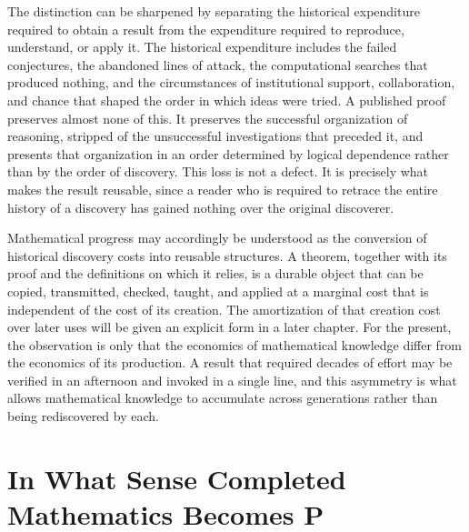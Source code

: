 \documentclass[11pt,letterpaper]{report}
\theoremstyle{plain}
\theoremstyle{definition}
\theoremstyle{remark}
\begin{document}
The distinction can be sharpened by separating the historical expenditure required to obtain a result from the expenditure required to reproduce, understand, or apply it. The historical expenditure includes the failed conjectures, the abandoned lines of attack, the computational searches that produced nothing, and the circumstances of institutional support, collaboration, and chance that shaped the order in which ideas were tried. A published proof preserves almost none of this. It preserves the successful organization of reasoning, stripped of the unsuccessful investigations that preceded it, and presents that organization in an order determined by logical dependence rather than by the order of discovery. This loss is not a defect. It is precisely what makes the result reusable, since a reader who is required to retrace the entire history of a discovery has gained nothing over the original discoverer.

Mathematical progress may accordingly be understood as the conversion of historical discovery costs into reusable structures. A theorem, together with its proof and the definitions on which it relies, is a durable object that can be copied, transmitted, checked, taught, and applied at a marginal cost that is independent of the cost of its creation. The amortization of that creation cost over later uses will be given an explicit form in a later chapter. For the present, the observation is only that the economics of mathematical knowledge differ from the economics of its production. A result that required decades of effort may be verified in an afternoon and invoked in a single line, and this asymmetry is what allows mathematical knowledge to accumulate across generations rather than being rediscovered by each.

\section{In What Sense Completed Mathematics Becomes P}
\end{document}

